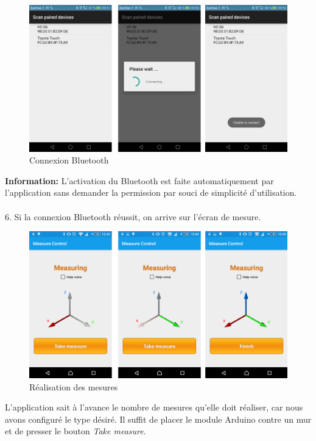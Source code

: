 \begin{figure}[H]
	\begin{center}
		\includegraphics[width=14cm]{img/bluetooth.png}
		\caption{Connexion Bluetooth}
		\label{bluetooth}
	\end{center}
\end{figure}
\textbf{Information: } L'activation du Bluetooth est faite automatiquement par l'application sans demander la permission par souci de simplicité d'utilisation.\\\\
6. Si la connexion Bluetooth réussit, on arrive sur l'écran de mesure.
\begin{figure}[H]
	\begin{center}
		\includegraphics[width=14cm]{img/measuring.png}
		\caption{Réalisation des mesures}
		\label{measuring}
	\end{center}
\end{figure}
L'application sait à l'avance le nombre de mesures qu'elle doit réaliser, car nous avons configuré le type désiré. Il suffit de placer le module Arduino contre un mur et de presser le bouton \textit{Take measure}.\\
